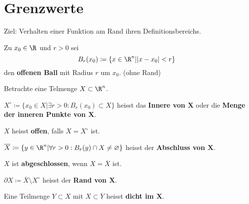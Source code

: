 \chapter{Grenzwerte}
Ziel: Verhalten einer Funktion am Rand ihren Definitionsbereichs.\\
\begin{def*}[note = offener Ball , index = offener Ball]
	Zu $x_0 \in \R$ und $r > 0$ sei
	\[ B_r(x_0) \coloneqq \{ x \in \R^n | \abs{x-x_0} < r \} \]
	den \textbf{offenen Ball} mit Radius $r$ um $x_0$. (ohne Rand)
\end{def*}

Betrachte eine Telmenge $X \subset \R^n$.\\
\begin{def*}[note = Innere , index = Innere]
	$X^\circ \coloneqq \{ x_0 \in X | \exists r > 0 : B_r(x_0) \subset X\}$ heisst das \textbf{Innere von $\mathbf{X}$} oder die \textbf{Menge der inneren Punkte von $\mathbf{X}$}.
\end{def*}
\begin{def*}[note = offen , index = offen]
	$X$ heisst \textbf{offen}, falls $X = X^\circ$ ist.
\end{def*}
\begin{def*}[note = Abschluss , index = Abschluss]
	$\overline{X} \coloneqq \{ y \in \R^n | \forall r > 0 : B_r(y) \cap X \neq \varnothing \}$ heisst der \textbf{Abschluss von $\mathbf{X}$}.
\end{def*}
\begin{def*}[note = abgeschlossen , index = abgeschlossen]
	$X$ ist \textbf{abgeschlossen}, wenn $X = \overline{X}$ ist.
\end{def*}
\begin{def*}[note = Rand , index = Rand]
	$\partial X \coloneqq \overline{X} \setminus X^\circ$ heisst der \textbf{Rand von $\mathbf{X}$}.
\end{def*}
\begin{def*}[note = dicht , index = dicht]
	Eine Teilmenge $Y \subset X$ mit $X \subset \overline{Y}$ heisst \textbf{dicht im $\mathbf{X}$}.
\end{def*}
